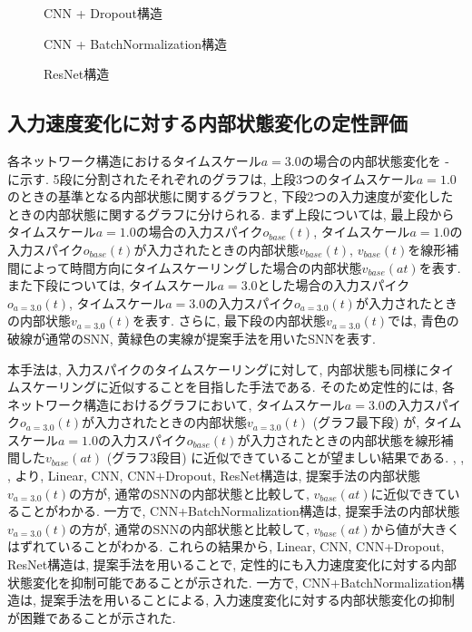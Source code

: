 \begin{figure}[htb]
    \centering
    
    \caption{CNN + Dropout構造}
    \label{fig:result1:1:cnn:dropout}
\end{figure}

\begin{figure}[htb]
    \centering
    
    \caption{CNN + BatchNormalization構造}
    \label{fig:result1:1:cnn:batchnormalization}
\end{figure}

\begin{figure}[htb]
    \centering
    
    \caption{ResNet構造}
    \label{fig:result1:1:resnet}
\end{figure}


\clearpage
\subsection{入力速度変化に対する内部状態変化の定性評価}
各ネットワーク構造におけるタイムスケール$a=3.0$の場合の内部状態変化を - に示す.
5段に分割されたそれぞれのグラフは, 上段3つのタイムスケール$a=1.0$のときの基準となる内部状態に関するグラフと, 下段2つの入力速度が変化したときの内部状態に関するグラフに分けられる.
まず上段については, 最上段からタイムスケール$a=1.0$の場合の入力スパイク$o_{base}(t)$, タイムスケール$a=1.0$の入力スパイク$o_{base}(t)$が入力されたときの内部状態$v_{base}(t)$, $v_{base}(t)$を線形補間によって時間方向にタイムスケーリングした場合の内部状態$v_{base}(at)$を表す.
また下段については, タイムスケール$a=3.0$とした場合の入力スパイク$o_{a=3.0}(t)$, タイムスケール$a=3.0$の入力スパイク$o_{a=3.0}(t)$が入力されたときの内部状態$v_{a=3.0}(t)$を表す.
さらに, 最下段の内部状態$v_{a=3.0}(t)$では, 青色の破線が通常のSNN, 黄緑色の実線が提案手法を用いたSNNを表す.

本手法は, 入力スパイクのタイムスケーリングに対して, 内部状態も同様にタイムスケーリングに近似することを目指した手法である.
そのため定性的には, 各ネットワーク構造におけるグラフにおいて, タイムスケール$a=3.0$の入力スパイク$o_{a=3.0}(t)$が入力されたときの内部状態$v_{a=3.0}(t)$ (グラフ最下段) が, タイムスケール$a=1.0$の入力スパイク$o_{base}(t)$が入力されたときの内部状態を線形補間した$v_{base}(at)$ (グラフ3段目) に近似できていることが望ましい結果である.
, , , より, Linear, CNN, CNN+Dropout, ResNet構造は, 提案手法の内部状態$v_{a=3.0}(t)$の方が, 通常のSNNの内部状態と比較して, $v_{base}(at)$に近似できていることがわかる.
一方で, CNN+BatchNormalization構造は, 提案手法の内部状態$v_{a=3.0}(t)$の方が, 通常のSNNの内部状態と比較して, $v_{base}(at)$から値が大きくはずれていることがわかる.
これらの結果から, Linear, CNN, CNN+Dropout, ResNet構造は, 提案手法を用いることで, 定性的にも入力速度変化に対する内部状態変化を抑制可能であることが示された.
一方で, CNN+BatchNormalization構造は, 提案手法を用いることによる, 入力速度変化に対する内部状態変化の抑制が困難であることが示された.

